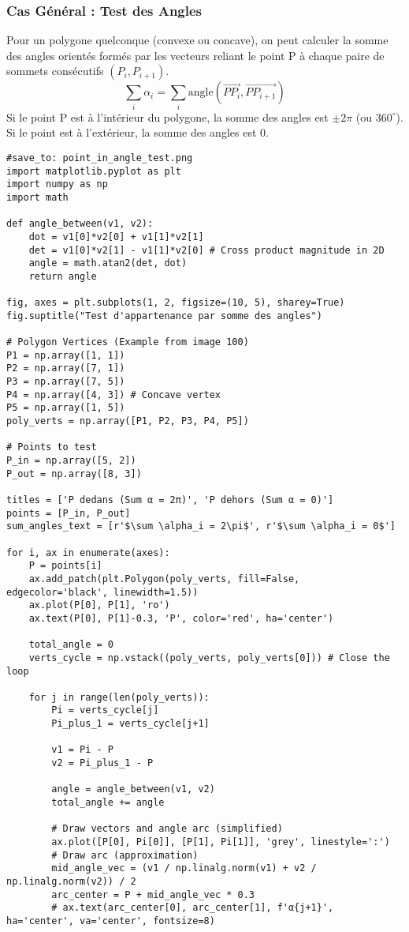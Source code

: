 \documentclass{article}
\begin{document}
\subsubsection{Cas Général : Test des Angles}
Pour un polygone quelconque (convexe ou concave), on peut calculer la somme des angles orientés formés par les vecteurs reliant le point P à chaque paire de sommets consécutifs $(P_i, P_{i+1})$.
\[ \sum_{i} \alpha_i = \sum_{i} \text{angle}(\vec{PP_i}, \vec{PP_{i+1}}) \]
Si le point P est à l'intérieur du polygone, la somme des angles est $\pm 2\pi$ (ou $360^\circ$). Si le point est à l'extérieur, la somme des angles est $0$.

\begin{verbatim}
#save_to: point_in_angle_test.png
import matplotlib.pyplot as plt
import numpy as np
import math

def angle_between(v1, v2):
    dot = v1[0]*v2[0] + v1[1]*v2[1]
    det = v1[0]*v2[1] - v1[1]*v2[0] # Cross product magnitude in 2D
    angle = math.atan2(det, dot)
    return angle

fig, axes = plt.subplots(1, 2, figsize=(10, 5), sharey=True)
fig.suptitle("Test d'appartenance par somme des angles")

# Polygon Vertices (Example from image 100)
P1 = np.array([1, 1])
P2 = np.array([7, 1])
P3 = np.array([7, 5])
P4 = np.array([4, 3]) # Concave vertex
P5 = np.array([1, 5])
poly_verts = np.array([P1, P2, P3, P4, P5])

# Points to test
P_in = np.array([5, 2])
P_out = np.array([8, 3])

titles = ['P dedans (Sum α = 2π)', 'P dehors (Sum α = 0)']
points = [P_in, P_out]
sum_angles_text = [r'$\sum \alpha_i = 2\pi$', r'$\sum \alpha_i = 0$']

for i, ax in enumerate(axes):
    P = points[i]
    ax.add_patch(plt.Polygon(poly_verts, fill=False, edgecolor='black', linewidth=1.5))
    ax.plot(P[0], P[1], 'ro')
    ax.text(P[0], P[1]-0.3, 'P', color='red', ha='center')

    total_angle = 0
    verts_cycle = np.vstack((poly_verts, poly_verts[0])) # Close the loop

    for j in range(len(poly_verts)):
        Pi = verts_cycle[j]
        Pi_plus_1 = verts_cycle[j+1]

        v1 = Pi - P
        v2 = Pi_plus_1 - P

        angle = angle_between(v1, v2)
        total_angle += angle

        # Draw vectors and angle arc (simplified)
        ax.plot([P[0], Pi[0]], [P[1], Pi[1]], 'grey', linestyle=':')
        # Draw arc (approximation)
        mid_angle_vec = (v1 / np.linalg.norm(v1) + v2 / np.linalg.norm(v2)) / 2
        arc_center = P + mid_angle_vec * 0.3
        # ax.text(arc_center[0], arc_center[1], f'α{j+1}', ha='center', va='center', fontsize=8)


\end{verbatim}
\end{document}
